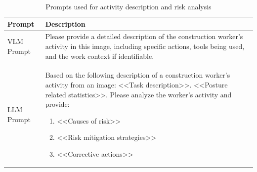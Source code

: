 \documentclass[11pt]{article}
\renewcommand{\baselinestretch}{1.5}
\begin{document}
\begin{table}[H]
\renewcommand{\baselinestretch}{1.0}\selectfont %
\renewcommand{\arraystretch}{0.92}              %
\setlength{\tabcolsep}{4pt}                     %
\centering
\small
\caption{Prompts used for activity description and risk analysis}
\begin{tabular}{p{3.2cm} p{11.5cm}}
\toprule
\textbf{Prompt} & \textbf{Description} \\
\midrule
VLM Prompt & \ttfamily Please provide a detailed description of the construction worker's activity in this image, including specific actions, tools being used, and the work context if identifiable. \\[0.5em]
LLM Prompt & \ttfamily Based on the following description of a construction worker's activity from an image: <<Task description>>. <<Posture related statistics>>. \newline\newline 
Please analyze the worker’s activity and provide: 
\begin{enumerate}[nosep, leftmargin=*]
    \item <<Causes of risk>>
    \item <<Risk mitigation strategies>>
    \item <<Corrective actions>>
\end{enumerate} \\
\bottomrule
\end{tabular}
\label{table:prompts}
\end{table}

\end{document}

